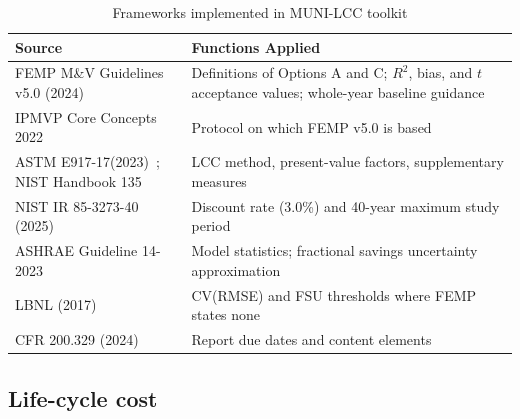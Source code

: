 \documentclass[10pt,twocolumn,letterpaper]{article}
\begin{document}
\begin{table}[t]
\caption{Frameworks implemented in MUNI-LCC toolkit}
\label{tab:sources}
\centering\small
\begin{tabular}{@{}>{\raggedright\arraybackslash}p{}>{\raggedright\arraybackslash}p{}@{}}
\toprule
Source & Functions Applied \\
\midrule
FEMP M\&V Guidelines v5.0 (2024)~\cite{femp2024} & Definitions of Options A and C; $R^2$, bias, and $t$ acceptance values; whole-year baseline guidance \\
IPMVP Core Concepts 2022~\cite{evo_ipmvp} & Protocol on which FEMP v5.0 is based \\
ASTM E917-17(2023)~\cite{astm_e917}; NIST Handbook 135~\cite{fuller1996} & LCC method, present-value factors, supplementary measures \\
NIST IR 85-3273-40 (2025)~\cite{nist2025} & Discount rate (3.0\%) and 40-year maximum study period \\
ASHRAE Guideline 14-2023~\cite{ashrae14} & Model statistics; fractional savings uncertainty approximation \\
LBNL (2017)~\cite{lbnl2017} & CV(RMSE) and FSU thresholds where FEMP states none \\
2 CFR 200.329 (2024)~\cite{cfr200329} & Report due dates and content elements \\
\bottomrule
\end{tabular}
\end{table}

\subsection{Life-cycle cost}
\end{document}
